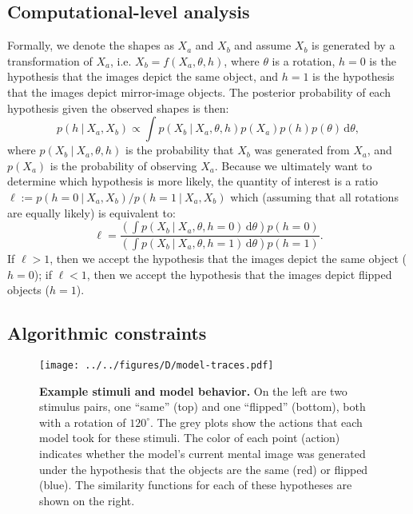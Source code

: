 \documentclass[10pt,letterpaper]{article}
\newcommand{\hi}[0]{h=0}
\newcommand{\hf}[0]{h=1}
\newcommand{\dif}[0]{\,\mathrm{d}}
\begin{document}
\subsection{Computational-level analysis}

Formally, we denote the shapes as $X_a$ and $X_b$ and assume $X_b$ is
generated by a transformation of $X_a$, i.e. $X_b=f(X_a, \theta, h)$,
where $\theta$ is a rotation, $\hi$ is the hypothesis that the images
depict the same object, and $\hf$ is the hypothesis that the images
depict mirror-image objects. The posterior probability of each
hypothesis given the observed shapes is then:
\begin{equation}
  p(h\ \vert\ X_a, X_b) \propto \int p(X_b\ \vert\ X_a, \theta, h)p(X_a)p(h)p(\theta)\dif\theta,
  \label{eq:posterior}
\end{equation}
where $p(X_b\ \vert\ X_a, \theta, h)$ is the probability that $X_b$
was generated from $X_a$, and $p(X_a)$ is the probability of observing
$X_a$. Because we ultimately want to determine which hypothesis is
more likely, the quantity of interest is a ratio $\ell:=p(\hi\ \vert\
X_a, X_b) / p(\hf\ \vert\ X_a, X_b)$ which (assuming that all
rotations are equally likely) is equivalent to:
\begin{equation}
  \ell = \frac{\left(\int p(X_b\ \vert\ X_a, \theta, \hi)\dif\theta\right)p(\hi)}{\left(\int p(X_b\ \vert\ X_a, \theta, \hf)\dif\theta\right)p(\hf)}.
  \label{eq:lh-ratio}
\end{equation}
If $\ell > 1$, then we accept the hypothesis that the images depict
the same object ($\hi$); if $\ell < 1$, then we accept the hypothesis
that the images depict flipped objects ($\hf$).

\subsection{Algorithmic constraints}

\begin{figure*}[t]
  \begin{center}
    \texttt{[image: ../../figures/D/model-traces.pdf]}
    \caption{\textbf{Example stimuli and model behavior.} On the left
      are two stimulus pairs, one ``same'' (top) and one ``flipped''
      (bottom), both with a rotation of $120^\circ$. The grey plots
      show the actions that each model took for these stimuli. The
      color of each point (action) indicates whether the model's
      current mental image was generated under the hypothesis that the
      objects are the same (red) or flipped (blue). The similarity
      functions for each of these hypotheses are shown on the right.}
    \label{fig:model-traces}
  \end{center}
\end{figure*}
\end{document}
